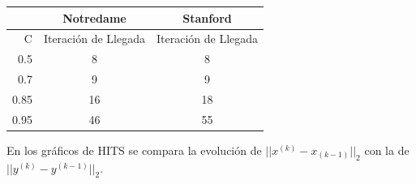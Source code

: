 \documentclass[a4paper]{article}
\begin{document}
\begin{center}
\begin{tabular}{r|c|c}
 & \textbf{Notredame} & \textbf{Stanford}\\
\hline
C & Iteración de Llegada & Iteración de Llegada \\
\hline
0.5 & 8 & 8\\
 \hline
0.7 & 9 & 9\\
\hline
0.85 & 16 & 18\\
\hline
0.95 & 46 & 55
\end{tabular}
\end{center}


\newpage

En los gráficos de HITS se compara la evolución de $||x^{(k)}-x_{(k-1)}||_2$ con la de $||y^{(k)}-y^{(k-1)}||_2$.\\
\end{document}
